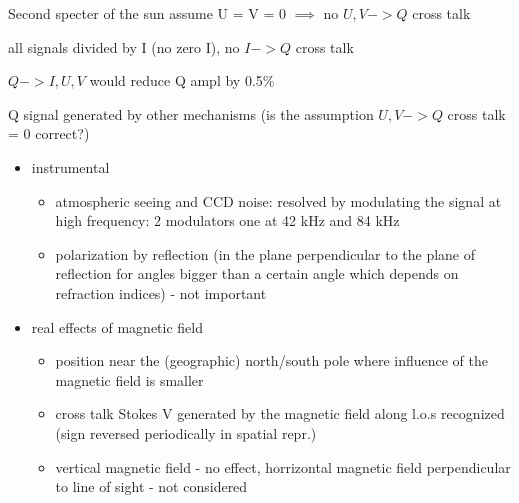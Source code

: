 \documentclass{beamer}
\begin{document}
\begin{frame}{Second specter of the sun}
assume U = V = 0 $\implies$ no $U,V -> Q$ cross talk

all signals divided by I (no zero I), no $I->Q$ cross talk

$Q->I,U,V$ would reduce Q ampl by 0.5\% 

Q signal generated by other mechanisms (is the assumption $U,V -> Q$ cross talk = 0 correct?)

\begin{itemize}
\item instrumental

\begin{itemize}

\item atmospheric seeing and CCD noise: resolved by modulating the signal at high frequency: 2 modulators one
at 42 kHz and 84 kHz
\item polarization by reflection (in the plane perpendicular to the plane of reflection for angles bigger than a certain angle which depends on refraction indices) - not important

\end{itemize}


\item real effects of magnetic field
\begin{itemize}
\item position near the (geographic) north/south pole where influence of the magnetic field is smaller

\item cross talk Stokes V generated by the magnetic field along l.o.s recognized (sign reversed periodically in spatial repr.)

\item vertical magnetic field - no effect, horrizontal magnetic field perpendicular to line of sight - not considered 

\end{itemize}
\end{itemize}
\end{frame}
\end{document}
